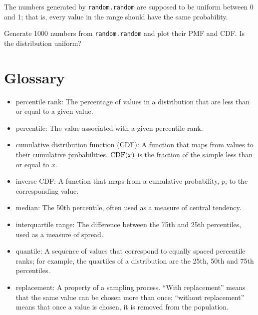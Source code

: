 \documentclass[12pt]{book}
\begin{document}
\begin{exercise}
The numbers generated by {\tt random.random} are supposed to be
uniform between 0 and 1; that is, every value in the range
should have the same probability.

Generate 1000 numbers from {\tt random.random} and plot their
PMF and CDF.  Is the distribution uniform?

\end{exercise}


\section{Glossary}

\begin{itemize}

\item percentile rank: The percentage of values in a distribution that are
less than or equal to a given value.

\item percentile: The value associated with a given percentile rank.

\item cumulative distribution function (CDF): A function that maps
  from values to their cumulative probabilities.  $\mathrm{CDF}(x)$ is the
  fraction of the sample less than or equal to $x$.  

\item inverse CDF: A function that maps from a cumulative probability,
  $p$, to the corresponding value.

\item median: The 50th percentile, often used as a measure of central
  tendency.  

\item interquartile range: The difference between
the 75th and 25th percentiles, used as a measure of spread.

\item quantile: A sequence of values that correspond to equally spaced
percentile ranks; for example, the quartiles of a distribution are
the 25th, 50th and 75th percentiles.

\item replacement: A property of a sampling process. ``With replacement''
means that the same value can be chosen more than once; ``without
replacement'' means that once a value is chosen, it is removed from
the population.

\end{itemize}
\end{document}
